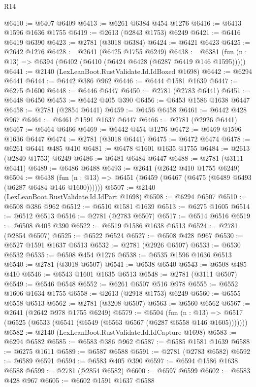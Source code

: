 \begin{lexlean}{R14}
\begin{coremodule}
@6410 := @6407 @6409
@6413 := @6261 @6384 @454 @1276
@6416 := @6413 @1596 @1636 @1755
@6419 := @2613 (@2843 @1753) @6249
@6421 := @6416 @6419 @6390
@6423 := @2781 (@3018 @6384)
@6424 := @6421 @6423
@6425 := @2642 @1276
@6428 := @2641 (@6425 @1755 @6249)
@6438 := @6381 (fun (n : @13) => @6394 (@6402 (@6410 (@6424 @6428 (@6287 @6419 @146 @1595)))))
@6441 := @2140 (LexLeanBoot.RustValidate.Id.IdBoxed @1698)
@6442 := @6294 @6441
@6444 := @6442 @386 @962
@6446 := @6444 @1581 @1639
@6447 := @6275 @1600
@6448 := @6446 @6447
@6450 := @2781 (@2783 @6441)
@6451 := @6448 @6450
@6453 := @6442 @405 @390
@6456 := @6453 @1586 @1638 @6447
@6458 := @2781 (@2854 @6441)
@6459 := @6456 @6458
@6461 := @6442 @428 @967
@6464 := @6461 @1591 @1637 @6447
@6466 := @2781 (@2926 @6441)
@6467 := @6464 @6466
@6469 := @6442 @454 @1276
@6472 := @6469 @1596 @1636 @6447
@6474 := @2781 (@3018 @6441)
@6475 := @6472 @6474
@6478 := @6261 @6441 @485 @410
@6481 := @6478 @1601 @1635 @1755
@6484 := @2613 (@2840 @1753) @6249
@6486 := @6481 @6484 @6447
@6488 := @2781 (@3111 @6441)
@6489 := @6486 @6488
@6493 := @2641 (@2642 @410 @1755 @6249)
@6504 := @6438
    (fun (n : @13) => @6451 (@6459 (@6467 (@6475 (@6489 @6493 (@6287 @6484 @146 @1600))))))
@6507 := @2140 (LexLeanBoot.RustValidate.Id.IdPart @1698)
@6508 := @6294 @6507
@6510 := @6508 @386 @962
@6512 := @6510 @1581 @1639
@6513 := @6275 @1605
@6514 := @6512 @6513
@6516 := @2781 (@2783 @6507)
@6517 := @6514 @6516
@6519 := @6508 @405 @390
@6522 := @6519 @1586 @1638 @6513
@6524 := @2781 (@2854 @6507)
@6525 := @6522 @6524
@6527 := @6508 @428 @967
@6530 := @6527 @1591 @1637 @6513
@6532 := @2781 (@2926 @6507)
@6533 := @6530 @6532
@6535 := @6508 @454 @1276
@6538 := @6535 @1596 @1636 @6513
@6540 := @2781 (@3018 @6507)
@6541 := @6538 @6540
@6543 := @6508 @485 @410
@6546 := @6543 @1601 @1635 @6513
@6548 := @2781 (@3111 @6507)
@6549 := @6546 @6548
@6552 := @6261 @6507 @516 @978
@6555 := @6552 @1606 @1634 @1755
@6558 := @2613 (@2918 @1753) @6249
@6560 := @6555 @6558 @6513
@6562 := @2781 (@3208 @6507)
@6563 := @6560 @6562
@6567 := @2641 (@2642 @978 @1755 @6249)
@6579 := @6504
    (fun (n : @13) => @6517 (@6525 (@6533 (@6541 (@6549 (@6563 @6567 (@6287 @6558 @146 @1605)))))))
@6582 := @2140 (LexLeanBoot.RustValidate.Id.IdCapture @1698)
@6583 := @6294 @6582
@6585 := @6583 @386 @962
@6587 := @6585 @1581 @1639
@6588 := @6275 @1611
@6589 := @6587 @6588
@6591 := @2781 (@2783 @6582)
@6592 := @6589 @6591
@6594 := @6583 @405 @390
@6597 := @6594 @1586 @1638 @6588
@6599 := @2781 (@2854 @6582)
@6600 := @6597 @6599
@6602 := @6583 @428 @967
@6605 := @6602 @1591 @1637 @6588

\end{coremodule}
\end{lexlean}
